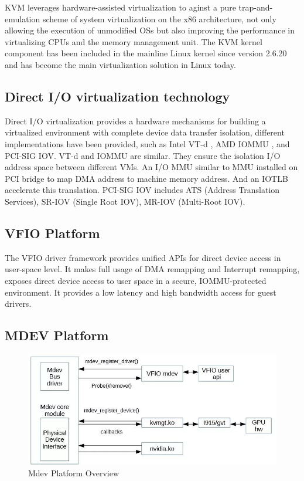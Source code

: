 \documentclass[a4paper,12pt]{article}
\begin{document}
KVM leverages hardware-assisted virtualization to aginst a pure trap-and-emulation scheme of system virtualization on the x86 architecture, not only allowing the execution of unmodified OSs but also improving the performance in virtualizing CPUs and the memory management unit. The KVM kernel component has been included in the mainline Linux kernel since version 2.6.20 and has become the main virtualization solution in Linux today. 

\subsection{ Direct I/O virtualization technology}

Direct I/O virtualization provides a hardware mechanisms for building a virtualized environment with complete device data transfer isolation, different implementations have been provided, such as  Intel VT-d \cite{vtd}, AMD IOMMU \cite{iommu}, and PCI-SIG IOV\cite{iov}. VT-d and IOMMU are similar. They ensure the isolation I/O address space between different VMs. An I/O MMU similar to MMU installed on PCI bridge to map DMA address to machine memory address. And an IOTLB accelerate this translation. PCI-SIG IOV includes ATS (Address Translation Services), SR-IOV (Single Root IOV), MR-IOV (Multi-Root IOV)\cite{sriov}. 

\subsection{VFIO Platform}

The VFIO driver framework provides unified APIs for direct device access in user-space level. It makes full usage of DMA remapping and Interrupt remapping, exposes direct device access to user space in a secure, IOMMU-protected environment. It provides a low latency and high bandwidth access for guest drivers.\cite{vfio} 

\subsection{MDEV Platform\cite{mdev}}
\begin{figure}
\centering
  \includegraphics[width=\linewidth]{mdev.png}
  \caption{Mdev Platform Overview}
  \label{fig:mdev}
\end{figure}
\end{document}
